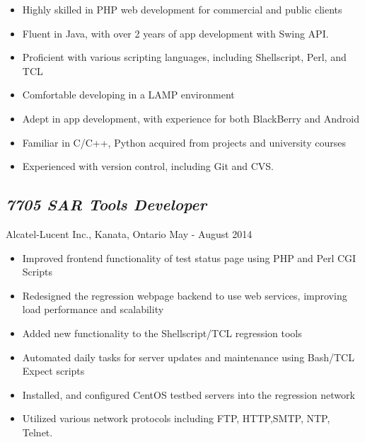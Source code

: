 \documentclass[10pt]{article}
\begin{document}
\begin{minipage}[t]{0.84\linewidth} 
	\begin{itemize}
		\item Highly skilled in PHP web development for commercial and public clients
		\item Fluent in Java, with over 2 years of app development with Swing API.
		\item Proficient with various scripting languages, including Shellscript, Perl, and TCL	
		\item Comfortable developing in a LAMP environment
		\item Adept in app development, with experience for both BlackBerry and Android
		\item Familiar in C/C++, Python acquired from projects and university courses
		\item Experienced with version control, including Git and CVS.
	\end{itemize}

	\subsection*{\textit{7705 SAR Tools Developer}} \vspace{-6pt} 
		Alcatel-Lucent Inc., Kanata, Ontario \hspace{175pt} May - August 2014
		\begin{itemize}
			\item Improved frontend functionality of test status page using PHP and Perl CGI Scripts		
			\item Redesigned the regression webpage backend to use web services, improving load performance and scalability			
			\item Added new functionality to the Shellscript/TCL regression tools
			\item Automated daily tasks for server updates and maintenance using Bash/TCL Expect scripts
			\item Installed, and configured CentOS testbed servers into the regression network
			\item Utilized various network protocols including FTP, HTTP,SMTP, NTP, Telnet.
		\end{itemize}


\end{minipage}
\end{document}
